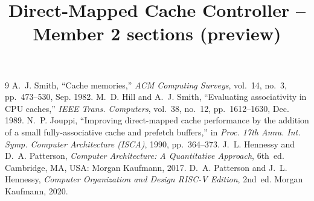 \documentclass[conference]{IEEEtran}
\begin{document}
\title{Direct-Mapped Cache Controller -- Member 2 sections (preview)}
\maketitle

\begin{thebibliography}{9}
 A.~J. Smith, ``Cache memories,'' \emph{ACM Computing Surveys}, vol.~14, no.~3, pp.~473--530, Sep. 1982.
 M.~D. Hill and A.~J. Smith, ``Evaluating associativity in CPU caches,'' \emph{IEEE Trans. Computers}, vol.~38, no.~12, pp.~1612--1630, Dec. 1989.
 N.~P. Jouppi, ``Improving direct-mapped cache performance by the addition of a small fully-associative cache and prefetch buffers,'' in \emph{Proc. 17th Annu. Int. Symp. Computer Architecture (ISCA)}, 1990, pp.~364--373.
 J.~L. Hennessy and D.~A. Patterson, \emph{Computer Architecture: A Quantitative Approach}, 6th~ed. Cambridge, MA, USA: Morgan Kaufmann, 2017.
 D.~A. Patterson and J.~L. Hennessy, \emph{Computer Organization and Design RISC-V Edition}, 2nd~ed. Morgan Kaufmann, 2020.
\end{thebibliography}
\end{document}
